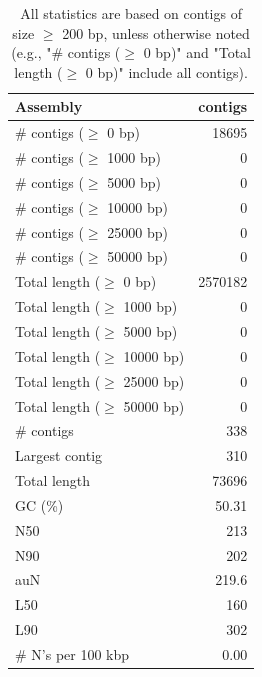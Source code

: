 \documentclass[12pt,a4paper]{article}
\begin{document}
\begin{table}[ht]
\begin{center}
\caption{All statistics are based on contigs of size $\geq$ 200 bp, unless otherwise noted (e.g., "\# contigs ($\geq$ 0 bp)" and "Total length ($\geq$ 0 bp)" include all contigs).}
\begin{tabular}{|l*{1}{|r}|}
\hline
Assembly & contigs \\ \hline
\# contigs ($\geq$ 0 bp) & 18695 \\ \hline
\# contigs ($\geq$ 1000 bp) & 0 \\ \hline
\# contigs ($\geq$ 5000 bp) & 0 \\ \hline
\# contigs ($\geq$ 10000 bp) & 0 \\ \hline
\# contigs ($\geq$ 25000 bp) & 0 \\ \hline
\# contigs ($\geq$ 50000 bp) & 0 \\ \hline
Total length ($\geq$ 0 bp) & 2570182 \\ \hline
Total length ($\geq$ 1000 bp) & 0 \\ \hline
Total length ($\geq$ 5000 bp) & 0 \\ \hline
Total length ($\geq$ 10000 bp) & 0 \\ \hline
Total length ($\geq$ 25000 bp) & 0 \\ \hline
Total length ($\geq$ 50000 bp) & 0 \\ \hline
\# contigs & 338 \\ \hline
Largest contig & 310 \\ \hline
Total length & 73696 \\ \hline
GC (\%) & 50.31 \\ \hline
N50 & 213 \\ \hline
N90 & 202 \\ \hline
auN & 219.6 \\ \hline
L50 & 160 \\ \hline
L90 & 302 \\ \hline
\# N's per 100 kbp & 0.00 \\ \hline
\end{tabular}
\end{center}
\end{table}
\end{document}
